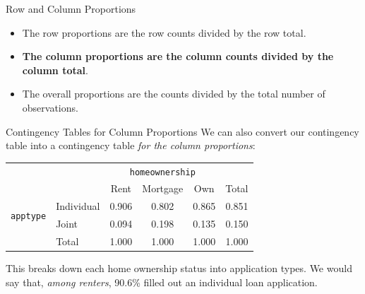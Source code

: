 \begin{frame}{Row and Column Proportions}
    \begin{itemize}
        \item The row proportions are the row counts divided by the row total.
        \item \textbf{The column proportions are the column counts divided by the column total}.
        \item The overall proportions are the counts divided by the total number of observations. 
    \end{itemize}
\end{frame}

\begin{frame}{Contingency Tables for Column Proportions}
    We can also convert our contingency table into a contingency table \textit{for the column proportions}:
    \begin{center}
        \begin{tabular}{r l ccc r}
		& & \multicolumn{3}{c}{{\texttt{homeownership}}} & \\
        \cline{3-5}
		& & Rent & Mortgage & Own & Total  \\ 
        \cline{2-6}
        \multirow{2}{*}{{\texttt{apptype}}} 
        & Individual & 0.906 & 0.802 & 0.865 & 0.851 \\ 
  		& Joint & 0.094 & 0.198 & 0.135 & 0.150 \\ 
        \cline{2-6}
  		& Total	& 1.000 & 1.000 & 1.000 & 1.000 \\
        \cline{2-6}
    \end{tabular}
    \end{center}
    
    \vspace{12pt}This breaks down each home ownership status into application types. We would say that, \textit{among renters}, 90.6\% filled out an individual loan application. 
\end{frame}


